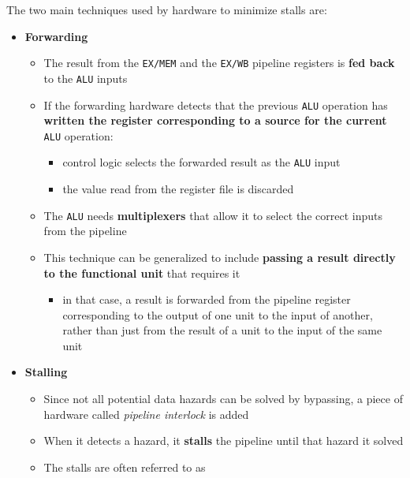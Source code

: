 \documentclass[english]{article}
\begin{document}
\bigskip
The two main techniques used by hardware to minimize stalls are:

\begin{itemize}
  \item \textbf{Forwarding}
        \begin{itemize}
          \item The result from the \texttt{EX/MEM} and the \texttt{EX/WB} pipeline registers is \textbf{fed back} to the \texttt{ALU} inputs
          \item If the forwarding hardware detects that the previous \texttt{ALU} operation has \textbf{written the register corresponding to a source for the current} \texttt{ALU} operation:
                \begin{itemize}
                  \item control logic selects the forwarded result as the \texttt{ALU} input
                  \item the value read from the register file is discarded
                \end{itemize}
          \item The \texttt{ALU} needs \textbf{multiplexers} that allow it to select the correct inputs from the pipeline
          \item This technique can be generalized to include \textbf{passing a result directly to the functional unit} that requires it
                \begin{itemize}
                  \item in that case, a result is forwarded from the pipeline register corresponding to the output of one unit to the input of another, rather than just from the result of a unit to the input of the same unit
                \end{itemize}
        \end{itemize}
  \item \textbf{Stalling}
        \begin{itemize}
          \item Since not all potential data hazards can be solved by bypassing, a piece of hardware called \textit{pipeline interlock} is added
          \item When it detects a hazard, it \textbf{stalls} the pipeline until that hazard it solved
          \item The stalls are often referred to as 
        \end{itemize}
\end{itemize}
\end{document}
